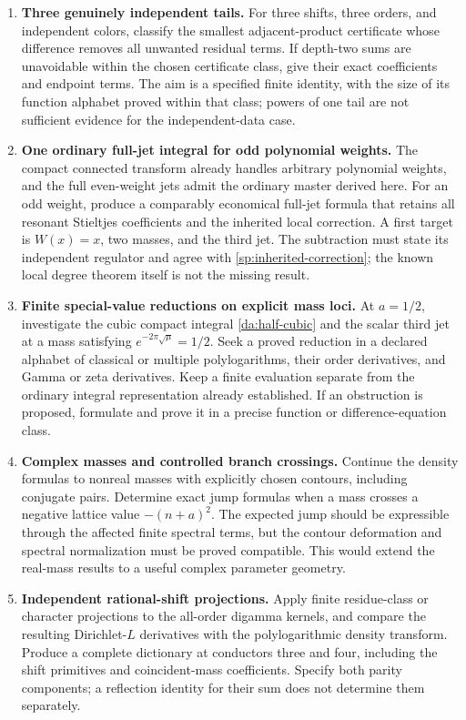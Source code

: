 \begin{enumerate}[label=\textbf{Q\arabic*.}]
\item \textbf{Three genuinely independent tails.}
For three shifts, three orders, and independent colors, classify the
smallest adjacent-product certificate whose difference removes all
unwanted residual terms. If depth-two sums are unavoidable within the
chosen certificate class, give their exact coefficients and endpoint
terms. The aim is a specified finite identity, with the size of its
function alphabet proved within that class; powers of one tail are not
sufficient evidence for the independent-data case.

\item \textbf{One ordinary full-jet integral for odd polynomial weights.}
The compact connected transform already handles arbitrary polynomial
weights, and the full even-weight jets admit the ordinary master derived
here. For an odd weight, produce a comparably economical full-jet formula
that retains all resonant Stieltjes coefficients and the inherited local
correction. A first target is \(W(x)=x\), two masses, and the third jet.
The subtraction must state its independent regulator and agree with
\eqref{sp:inherited-correction}; the known local degree theorem itself is
not the missing result.

\item \textbf{Finite special-value reductions on explicit mass loci.}
At \(a=1/2\), investigate the cubic compact integral
\eqref{da:half-cubic} and the scalar third jet at a mass satisfying
\(e^{-2\pi\sqrt\mu}=1/2\). Seek a proved reduction in a declared alphabet
of classical or multiple polylogarithms, their order derivatives, and
Gamma or zeta derivatives. Keep a finite evaluation separate from the
ordinary integral representation already established. If an obstruction
is proposed, formulate and prove it in a precise function or
difference-equation class.

\item \textbf{Complex masses and controlled branch crossings.}
Continue the density formulas to nonreal masses with explicitly chosen
contours, including conjugate pairs. Determine exact jump formulas when a
mass crosses a negative lattice value \(- (n+a)^2\). The expected jump
should be expressible through the affected finite spectral terms, but
the contour deformation and spectral normalization must be proved
compatible. This would extend the real-mass results to a useful complex
parameter geometry.

\item \textbf{Independent rational-shift projections.}
Apply finite residue-class or character projections to the all-order
digamma kernels, and compare the resulting Dirichlet-\(L\) derivatives
with the polylogarithmic density transform. Produce a complete dictionary
at conductors three and four, including the shift primitives and
coincident-mass coefficients. Specify both parity components; a
reflection identity for their sum does not determine them separately.


\end{enumerate}
